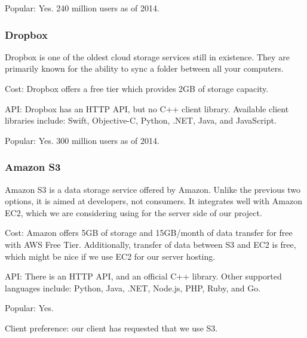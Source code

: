 Popular: Yes. 240 million users as of 2014. \cite{fortune}

\subsubsection{ Dropbox }

Dropbox \cite{dropbox} is one of the oldest cloud storage services still in existence. They are primarily known for the ability to sync a folder between all your computers.

Cost: Dropbox offers a free tier which provides 2GB of storage capacity.
\cite{dropboxplans}

API: Dropbox has an HTTP API,
\cite{dropboxapi}
but no C++ client library.
Available client libraries include:
Swift, Objective-C, Python, .NET, Java, and JavaScript.




Popular: Yes. 300 million users as of 2014. \cite{fortune}

\subsubsection{ Amazon S3 }

Amazon S3 \cite{s3} is a data storage service offered by Amazon. Unlike the previous two options, it is aimed at developers, not consumers.
It integrates well with Amazon EC2, which we are considering using for the server side of our project.

Cost: Amazon offers 5GB of storage and 15GB/month of data transfer for free with AWS Free Tier. \cite{s3-pricing} Additionally, transfer of data between S3 and EC2 is free, which might be nice if we use EC2 for our server hosting.

API: There is an HTTP API, and an official C++ library. \cite{aws-sdk}
Other supported languages include: Python, Java, .NET, Node.js, PHP, Ruby, and Go.

Popular: Yes.

Client preference: our client has requested that we use S3.


